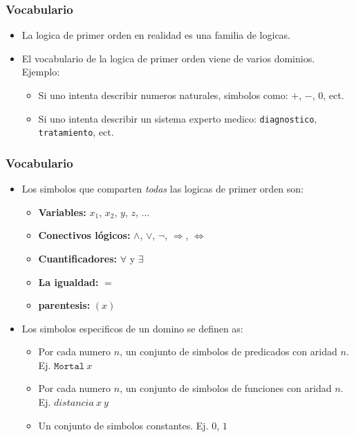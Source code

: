 \documentclass{beamer}
\begin{document}
\begin{frame}
    \frametitle{Vocabulario}
    \begin{itemize}
        \item{La logica de primer orden en realidad es una familia de logicas.}
        \item{El vocabulario de la logica de primer orden viene de varios dominios. Ejemplo:
            \begin{itemize}
                \item{Si uno intenta describir numeros naturales, simbolos como: $+$, $-$, $0$, ect.}
                \item{Si uno intenta describir un sistema experto medico: \texttt{diagnostico}, \texttt{tratamiento}, ect.}
            \end{itemize}
        }
    \end{itemize}
\end{frame}

\begin{frame}
    \frametitle{{Vocabulario}}
    \begin{itemize}
        \item{Los simbolos que comparten \emph{todas} las logicas de primer orden son:
        \begin{itemize}
            \item{{\bf Variables:} $x_1$, $x_2$, $y$, $z$, $\ldots$}
            \item{{\bf Conectivos l\'ogicos:} $\wedge$, $\vee$, $\neg$, $\Rightarrow$, $\Leftrightarrow$}
            \item{{\bf Cuantificadores:} $\forall$ y $\exists$}
            \item{{\bf La igualdad:} $=$}
            \item{{\bf parentesis:} $(x)$}
        \end{itemize}
        }
        \item{Los simbolos especificos de un domino se definen as:
        \begin{itemize}
            \item{Por cada numero $n$, un conjunto de simbolos de predicados con aridad $n$. Ej. $\mathtt{Mortal}\ x$}
            \item{Por cada numero $n$, un conjunto de simbolos de funciones con aridad $n$. Ej. $distancia\ x\ y$}
            \item{Un conjunto de simbolos constantes. Ej. $0$, $1$}
        \end{itemize}
        }
    \end{itemize}
\end{frame}
\end{document}
